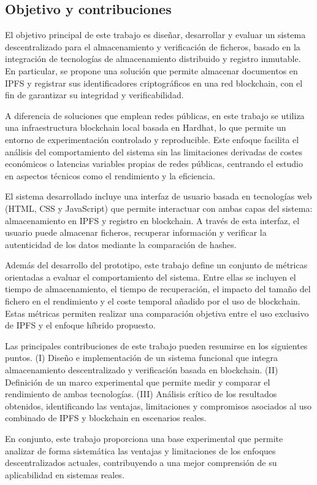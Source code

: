 \subsection{Objetivo y contribuciones}

El objetivo principal de este trabajo es diseñar, desarrollar y evaluar un sistema 
descentralizado para el almacenamiento y verificación de ficheros, basado en la
integración de tecnologías de almacenamiento distribuido y registro inmutable.
En particular, se propone una solución que permite almacenar documentos en 
IPFS y registrar sus identificadores criptográficos en una red blockchain, 
con el fin de garantizar su integridad y verificabilidad.

A diferencia de soluciones que emplean redes públicas, en este trabajo 
se utiliza una infraestructura blockchain local basada en Hardhat, 
lo que permite un entorno de experimentación controlado y reproducible. 
Este enfoque facilita el análisis del comportamiento del sistema sin las 
limitaciones derivadas de costes económicos o latencias variables propias 
de redes públicas, centrando el estudio en aspectos técnicos como el rendimiento 
y la eficiencia.

El sistema desarrollado incluye una interfaz de usuario basada en tecnologías
web (HTML, CSS y JavaScript) que permite interactuar con ambas capas del 
sistema: almacenamiento en IPFS y registro en blockchain. A través de esta interfaz,
el usuario puede almacenar ficheros, recuperar información 
y verificar la autenticidad de los datos mediante la comparación de hashes.

Además del desarrollo del prototipo, este trabajo define un conjunto de 
métricas orientadas a evaluar el comportamiento del sistema. 
Entre ellas se incluyen el tiempo de almacenamiento, el tiempo de recuperación, 
el impacto del tamaño del fichero en el rendimiento y el coste temporal añadido
por el uso de blockchain. Estas métricas permiten realizar una comparación 
objetiva entre el uso exclusivo de IPFS y el enfoque híbrido propuesto.

Las principales contribuciones de este trabajo pueden resumirse en los 
siguientes puntos. (I) Diseño e implementación de un sistema
funcional que integra almacenamiento descentralizado y verificación basada 
en blockchain. (II) Definición de un marco experimental que
permite medir y comparar el rendimiento de ambas tecnologías. (III) Análisis crítico de los resultados obtenidos, identificando las ventajas,
limitaciones y compromisos asociados al uso combinado de IPFS y 
blockchain en escenarios reales.

En conjunto, este trabajo proporciona una base experimental que 
permite analizar de forma sistemática las ventajas y limitaciones 
de los enfoques descentralizados actuales, contribuyendo a una 
mejor comprensión de su aplicabilidad en sistemas reales.